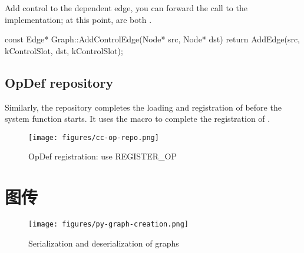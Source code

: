 \begin{content}
Add control to the dependent edge, you can forward the call to the  implementation; at this point,  are both .

\begin{leftbar}
\begin{c++}
const Edge* Graph::AddControlEdge(Node* src, Node* dst) {
  return AddEdge(src, kControlSlot, dst, kControlSlot);
}
\end{c++}
\end{leftbar}

\subsection{OpDef repository}

Similarly, the  repository completes the loading and registration of  before the system function starts. It uses the  macro to complete the registration of .

\begin{figure}[H]
\centering
\texttt{[image: figures/cc-op-repo.png]}
\caption{OpDef registration: use REGISTER\_OP}
 \label{fig:cc-op-repo}
\end{figure}

\end{content}

\section{图传}

\begin{content}

\begin{figure}[H]
\centering
\texttt{[image: figures/py-graph-creation.png]}
\caption{Serialization and deserialization of graphs}
 \label{fig:py-graph-creation}
\end{figure}

\end{content}
